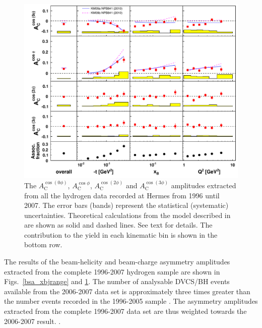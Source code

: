 \begin{figure}
  \begin{center}
    \includegraphics[width=15cm]{bcaplots_eml_par13_bin6_all_release_pic_update_withassoc}
    \caption{The $A_{\textrm{C}}^{\cos(0\phi)}$, $A_{\textrm{C}}^{\cos\phi}$, $A_{\textrm{C}}^{\cos(2\phi)}$ and $A_{\textrm{C}}^{\cos(3\phi)}$  amplitudes extracted from all the hydrogen data recorded at H{\sc ermes} from 1996 until 2007. The error bars (bands) represent the statistical (systematic) uncertainties.  Theoretical calculations from the model described in \cite{Kum09} are shown as solid and dashed lines. See text for details. The  contribution  to the yield in each kinematic bin is shown in the bottom row.}
  \label{bca_xbjrange}
 \end{center}
\end{figure}
The results of the beam-helicity and beam-charge asymmetry amplitudes extracted from the complete 1996-2007 hydrogen sample are shown in Figs.~\ref{bsa_xbjrange} and \ref{bca_xbjrange}. The number of analysable DVCS/BH events available from the 2006-2007 data set  is approximately three times greater than the number events recorded in the 1996-2005 sample . The  asymmetry amplitudes extracted from the complete 1996-2007 data set are thus weighted towards the 2006-2007 result. .

